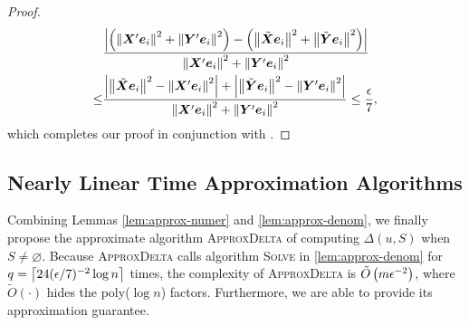 \documentclass[sigconf]{acmart}
\begin{document}
\begin{proof}
    \begin{align*}
            & \frac{\left|\left( \left\Vert\boldsymbol{X}'\boldsymbol{e}_i\right\Vert^2+\left\Vert\boldsymbol{Y}'\boldsymbol{e}_i\right\Vert^2 \right)-\left( \left\Vert\tilde{\boldsymbol{X}}\boldsymbol{e}_i\right\Vert^2+\left\Vert\tilde{\boldsymbol{Y}}\boldsymbol{e}_i\right\Vert^2 \right) \right|}{\left\Vert\boldsymbol{X}'\boldsymbol{e}_i\right\Vert^2+\left\Vert\boldsymbol{Y}'\boldsymbol{e}_i\right\Vert^2}             \\
        \le & \frac{\left|\left\Vert\tilde{\boldsymbol{X}}\boldsymbol{e}_i\right\Vert^2-\left\Vert\boldsymbol{X}'\boldsymbol{e}_i\right\Vert^2 \right|+\left|\left\Vert\tilde{\boldsymbol{Y}}\boldsymbol{e}_i\right\Vert^2-\left\Vert\boldsymbol{Y}'\boldsymbol{e}_i\right\Vert^2 \right|}{\left\Vert\boldsymbol{X}'\boldsymbol{e}_i\right\Vert^2+\left\Vert\boldsymbol{Y}'\boldsymbol{e}_i\right\Vert^2}\le\frac{\epsilon}{7},
    \end{align*}
    which completes our proof in conjunction with .
\end{proof}

\subsection{Nearly Linear Time Approximation Algorithms}

Combining Lemmas \ref{lem:approx-numer} and \ref{lem:approx-denom}, we finally propose the approximate algorithm \textsc{ApproxDelta} of computing \(\Delta(u,S)\) when \(S\neq\varnothing\).
Because \textsc{ApproxDelta} calls algorithm \textsc{Solve} in \ref{lem:approx-denom} for \(q=\left\lceil24(\epsilon/7)^{-2}\log n\right\rceil\) times, the complexity of \textsc{ApproxDelta} is \(\tilde{O}\left( m\epsilon^{-2} \right)\), where \(\tilde{O}(\cdot)\) hides the poly(\(\log n\)) factors.
Furthermore, we are able to provide its approximation guarantee.
\end{document}
